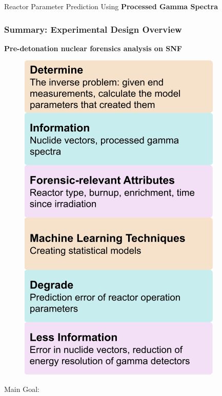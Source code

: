 \begin{frame}
\begin{adjustwidth}{-10pt}{-10pt}
\begin{minipage}{0.5\textwidth}
\begin{block}{Reactor Parameter Prediction Using \textbf{Processed Gamma Spectra}}
\begin{figure}
      \end{figure}
    \end{block}
  \end{minipage}
  \end{adjustwidth}
\end{frame}

\begin{frame}
  \frametitle{Summary: Experimental Design Overview}
  \begin{adjustwidth}{-15pt}{-10pt}
  \textbf{Pre-detonation nuclear forensics analysis on SNF}\\
  \vspace{2pt}
  \begin{minipage}{0.38\textwidth}
    \begin{figure}
      \centering
      \includegraphics[height=0.78\textheight]{./figures/overview.png}
    \end{figure}
  \end{minipage}%
  \hfill
  \begin{minipage}{0.65\textwidth}
    \begin{block}{Main Goal:}

\end{block}
\end{minipage}
\end{adjustwidth}
\end{frame}
